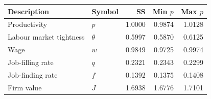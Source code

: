\centering
\caption{Equilibrium objects across productivity states}
\begin{tabular}{llrrr}
\toprule
\textbf{Description} & \textbf{Symbol} & \textbf{SS} & \textbf{Min $p$} & \textbf{Max $p$} \\
\midrule
Productivity          & $p$       &   1.0000 &   0.9874 &   1.0128 \\
Labour market tightness & $\theta$ &   0.5997 &   0.5870 &   0.6125 \\
Wage                    & $w$       &   0.9849 &   0.9725 &   0.9974 \\
Job-filling rate        & $q$       &   0.2321 &   0.2343 &   0.2299 \\
Job-finding rate        & $f$       &   0.1392 &   0.1375 &   0.1408 \\
Firm value              & $J$       &   1.6938 &   1.6776 &   1.7101 \\
\bottomrule
\end{tabular}
